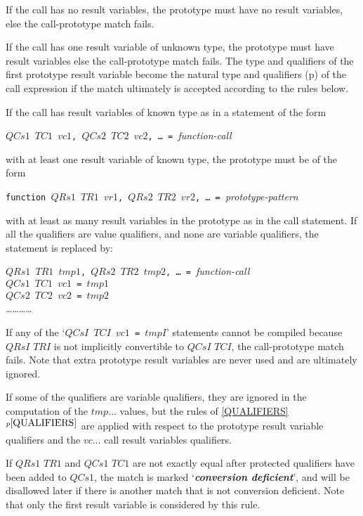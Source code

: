 \documentclass[12pt]{article}
\newcommand{\key}[1]{{\bf \em #1}\index{#1}}
\newcommand{\itemref}[1]{\ref{#1}$^{p\pageref{#1}}$}
\newcommand{\pagref}[1]{p\pageref{#1}}
\newenvironment{indpar}[1][0.3in]%
	{\begin{list}{}%
		     {\setlength{\itemsep}{0in}%
		      \setlength{\topsep}{0in}%
		      \setlength{\parsep}{1ex}%
		      \setlength{\labelwidth}{#1}%
		      \setlength{\leftmargin}{#1}%
		      \addtolength{\leftmargin}{\labelsep}}%
	 \item}%
	{\end{list}}
\begin{document}
\begin{enumerate}
\item If the call has no result variables, the
prototype must have no result variables,
else the call-prototype match fails.

\item If the call has one result variable of
unknown type, the prototype must have result variables
else the call-prototype match fails.
The type and qualifiers of the first
prototype result variable become the natural
type and qualifiers (\pagref{NATURAL-TYPE})
of the call expression if
the match ultimately is accepted according to the rules below.

\item \label{FUNCTION-CALL-ASSIGNMENT-COMPILATION}
If the call has result variables of known type
as in a statement of the form
\begin{center}
{\tt $QCs1$ $TC1$ $vc1$, $QCs2$ $TC2$ $vc2$, \ldots{}~=~}{\em function-call}
\end{center}
with at least one result variable of known type,
the prototype must be of the form
\begin{center}
{\tt function $QRs1$ $TR1$ $vr1$, $QRs2$ $TR2$ $vr2$,
     \ldots{}~=~}{\em prototype-pattern}
\end{center}
with at least as many result variables in the prototype as in
the call statement.  If all the qualifiers are value qualifiers,
and none are variable qualifiers, the statement is
replaced by:
\begin{indpar}
{\tt $QRs1$ $TR1$ $tmp1$, $QRs2$ $TR2$ $tmp2$,
    \ldots{}~=~}{\em function-call} \\
{\tt $QCs1$ $TC1$ $vc1$ = $tmp1$} \\
{\tt $QCs2$ $TC2$ $vc2$ = $tmp2$} \\
\ldots\ldots\ldots\ldots
\end{indpar}
If any of the `{\tt $QCsI$ $TCI$ $vc1$ = $tmpI$}' statements cannot be
compiled because $QRsI$ $TRI$ is not implicitly convertible
to $QCsI$ $TCI$, the call-prototype match fails.
Note that extra prototype result variables
are never used and are ultimately ignored.

If some of the qualifiers are variable qualifiers, they are
ignored in the computation of the $tmp\ldots$ values, but
the rules of \itemref{QUALIFIERS} are applied with respect to
the prototype result variable qualifiers and the $vc\ldots$
call result variables qualifiers.

If $QRs1$ $TR1$ and $QCs1$ $TC1$ are not exactly equal after protected
qualifiers have been added to $QCs1$,
the match is marked
`\key{conversion deficient}'\label{CONVERSION-DEFICIENT},
and will be disallowed later
if there is another match that is not conversion deficient.
Note that only the first result variable is considered by this rule.

\end{enumerate}
\end{document}
